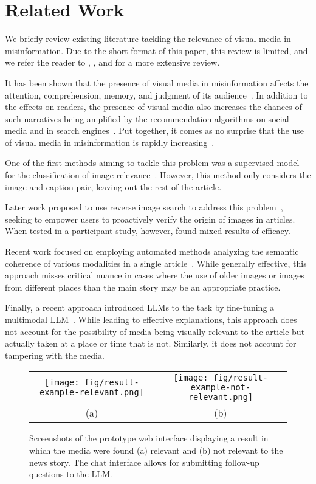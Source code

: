 \section{Related Work}
We briefly review existing literature tackling the relevance of visual media in misinformation. Due to the short format of this paper, this review is limited, and we refer the reader to \citet{micallef2022cross}, \citet{bu2023combating}, and \citet{hartwig2024landscape} for a more extensive review.

It has been shown that the presence of visual media in misinformation affects the attention, comprehension, memory, and judgment of its audience~\cite{newman2023misinformed}. In addition to the effects on readers, the presence of visual media also increases the chances of such narratives being amplified by the recommendation algorithms on social media and in search engines~\cite{li2020picture,abell2023digital}. Put together, it comes as no surprise that the use of visual media in misinformation is rapidly increasing~\cite{yang2023visual, dufour2024ammeba}.

One of the first methods aiming to tackle this problem was a supervised model for the classification of image relevance~\cite{aneja2021cosmos}. However, this method only considers the image and caption pair, leaving out the rest of the article.

Later work proposed to use reverse image search to address this problem~\cite{qian2023fighting}, seeking to empower users to proactively verify the origin of images in articles. When tested in a participant study, however, \citet{qian2023fighting} found mixed results of efficacy.

Recent work focused on employing automated methods analyzing the semantic coherence of various modalities in a single article~\cite{xu2024mmooc}. While generally effective, this approach misses critical nuance in cases where the use of older images or images from different places than the main story may be an appropriate practice.

Finally, a recent approach introduced LLMs to the task by fine-tuning a multimodal LLM~\cite{qi2024sniffer}. While leading to effective explanations, this approach does not account for the possibility of media being visually relevant to the article but actually taken at a place or time that is not. Similarly, it does not account for tampering with the media.

\begin{figure*}[t] %
    \centering
    \begin{tabular}{cc}
        \texttt{[image: fig/result-example-relevant.png]} &
        \texttt{[image: fig/result-example-not-relevant.png]} \\
        (a) & (b)
    \end{tabular}
    \caption{
    Screenshots of the prototype web interface displaying a result in which the media were found (a) relevant and (b) not relevant to the news story. The chat interface allows for submitting follow-up questions to the LLM.
    }
    \label{fig:result}
\end{figure*}